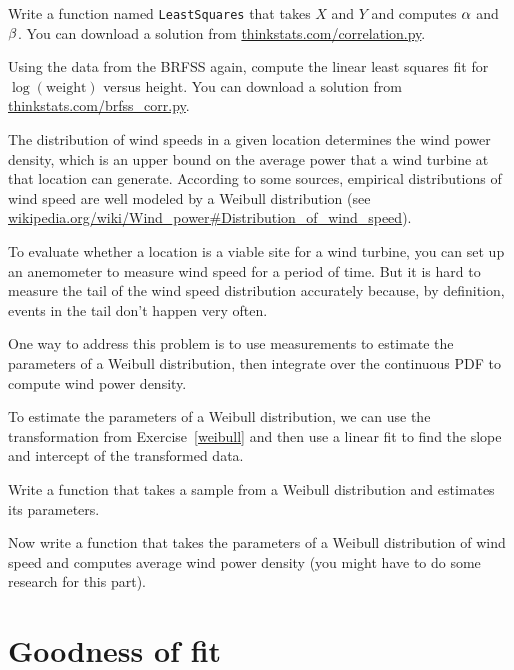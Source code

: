 \documentclass[12pt]{book}
\begin{document}
\begin{ex}

Write a function named {\tt LeastSquares} that takes $X$ and $Y$ and
computes $\alpha$ and $\beta$.  You can download a solution from
\url{thinkstats.com/correlation.py}.

\end{ex}

\begin{ex}

Using the data from the BRFSS again, compute the linear least squares
fit for $\log(\mathrm{weight})$ versus height.  You can download a
solution from \url{thinkstats.com/brfss_corr.py}.

\end{ex}


\begin{ex}

The distribution of wind speeds in a given location determines the
wind power density, which is an upper bound on the average power that
a wind turbine at that location can generate.  According to some
sources, empirical distributions of wind speed are well modeled by a
Weibull distribution (see
\url{wikipedia.org/wiki/Wind_power#Distribution_of_wind_speed}).

To evaluate whether a location is a viable site for a wind turbine,
you can set up an anemometer to measure wind speed for a period of
time.  But it is hard to measure the tail of the wind speed distribution
accurately because, by definition, events in the tail don't happen
very often.

One way to address this problem is to use measurements to estimate the
parameters of a Weibull distribution, then integrate over the
continuous PDF to compute wind power density.

To estimate the parameters of a Weibull distribution, we can use the
transformation from Exercise~\ref{weibull} and then use a linear fit
to find the slope and intercept of the transformed data.

Write a function that takes a sample from a Weibull distribution and
estimates its parameters.

Now write a function that takes the parameters of a Weibull distribution
of wind speed and computes average wind power density (you might have
to do some research for this part).

\end{ex}


\section{Goodness of fit}
\end{document}
